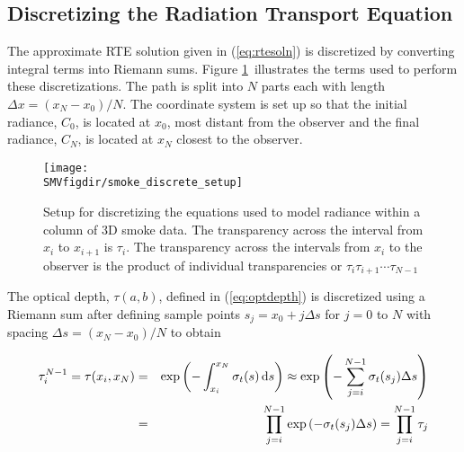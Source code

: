 \subsection{Discretizing the Radiation Transport Equation}
\newcommand{\htau}[1]{\tau_{#1}^{N-1}}
\newcommand{\halpha}[1]{\alpha_{#1}^{N-1}}
\newcommand{\sigai}[1]{\sigma_{a,#1}}
\newcommand{\Lei}[1]{C_{e,#1}}
\newcommand{\Lhatj}[1]{C_{#1}^N}
\newcommand{\Lhatjj}[1]{\hat{C}_{#1}^N}
\newcommand{\Chatjj}[1]{\hat{C}_{#1}^N}
\newcommand{\Leii}[1]{\hat{C}_{e,#1}}

The approximate RTE solution given in (\ref{eq:rtesoln}) is
discretized by converting integral terms into Riemann sums. Figure
\ref{fig:smokediscretesetup}\ illustrates the terms used to
perform these discretizations.  The path is split into $N$ parts
each with length $\Delta x=(x_N-x_0)/N$.  The coordinate system is
set up so that the initial radiance, $C_0$, is located at $x_0$,
most distant from the observer and the final radiance, $C_N$, is
located at $x_N$ closest to the observer.

\begin{figure}[bph]
\begin{center}
\texttt{[image: \\SMVfigdir/smoke\_discrete\_setup]}
\end{center}
\caption[Setup for discretizing the equations used to model
radiance within a column of 3D smoke data.]{Setup for discretizing
the equations used to model radiance within a column of 3D smoke
data. The transparency across the interval from $x_i$ to $x_{i+1}$
is $\tau_i$. The transparency across the intervals from $x_i$ to
the observer is the product of individual transparencies or
$\tau_i\tau_{i+1}\cdots\tau_{N-1}$} \label{fig:smokediscretesetup}
\end{figure}

The optical depth, $\tau(a,b)$, defined in (\ref{eq:optdepth}) is
discretized using a Riemann sum  after defining sample points
$s_j=x_0+j\Delta s$ for $j=0$ to $N$ with spacing $\Delta
s=(x_N-x_0)/N$ to obtain

\begin{eqnarray}
\htau{i}=\tau(x_i,x_N)&=&\exp\left(-\int_{x_i}^{x_N}\sigma_t(s)\dx{s}\right)\approx\exp\left(-\sum_{j=i}^{N-1}\sigma_t(s_j)\Delta s\right)\\
&=&\prod_{j=i}^{N-1}\exp\left(-\sigma_t(s_j)\Delta s\right)=\prod_{j=i}^{N-1}\tau_j
\end{eqnarray}

